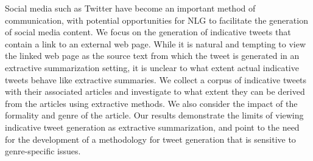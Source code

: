 Social media such as Twitter have become an important method of communication, with potential opportunities for NLG to facilitate the generation of social media content. We focus on the generation of indicative tweets that contain a link to an external web page. While it is natural and tempting to view the linked web page as the source text from which the tweet is generated in an extractive summarization setting, it is unclear to what extent actual indicative tweets behave like extractive summaries. We collect a corpus of indicative tweets with their associated articles and investigate to what extent they can be derived from the articles using extractive methods. We also consider the impact of the formality and genre of the article. Our results demonstrate the limits of viewing indicative tweet generation as extractive summarization, and point to the need for the development of a methodology for tweet generation that is sensitive to genre-specific issues.
